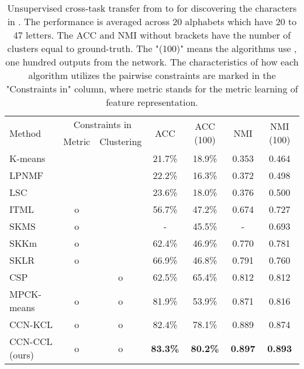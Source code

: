 \documentclass[10pt,twocolumn,letterpaper]{article}
\begin{document}
\begin{table*}[]
\centering
\caption{Unsupervised cross-task transfer from  to  for discovering the characters in . The performance is averaged across 20 alphabets which have 20 to 47 letters. The ACC and NMI without brackets have the number of clusters equal to ground-truth.  The "(100)" means the algorithms use , \ie one hundred outputs from the network. The characteristics of how each algorithm utilizes the pairwise constraints are marked in the "Constraints in" column, where metric stands for the metric learning of feature representation. }
\label{tab:crosstask-omnilgot}
\begin{tabular}{lcccccc}
\toprule
\multirow{2}{*}{Method} & \multicolumn{2}{c}{Constraints in} & \multirow{2}{*}{ACC} & \multirow{2}{*}{ACC (100)} & \multirow{2}{*}{NMI} & \multirow{2}{*}{NMI (100)} \\
                & Metric & Clustering &            &                              &                             &                              \\ \midrule
K-means \cite{macqueen1967some}        &     &      & 21.7\%    & 18.9\%  & 0.353   & 0.464  \\ 
LPNMF \cite{cai2009LPNMF}          &     &      & 22.2\%    & 16.3\%  & 0.372   & 0.498  \\
LSC \cite{chen2011LSC}            &     &      & 23.6\%    & 18.0\%  & 0.376   & 0.500  \\
ITML \cite{davis2007ITML}           & o   &      & 56.7\%    & 47.2\%  & 0.674   & 0.727  \\
SKMS \cite{anand2014SKMS}           & o   &      & -         & 45.5\%  & -       & 0.693  \\
SKKm \cite{anand2014SKMS}            & o   &      & 62.4\%    & 46.9\%  & 0.770   & 0.781  \\
SKLR \cite{amid2016SKLR}           & o   &      & 66.9\%    & 46.8\%  & 0.791   & 0.760  \\
CSP \cite{wang2014CSP}             &     & o    & 62.5\%    & 65.4\%  & 0.812   & 0.812  \\
MPCK-means \cite{bilenko2004MPCKMeans}     & o   & o    & 81.9\%    & 53.9\%  & 0.871   & 0.816  \\ 
CCN-KCL \cite{Hsu18iclr}            & o   & o    & 82.4\%    & 78.1\%  & 0.889   & 0.874  \\ \midrule
CCN-CCL (ours)     & o   & o    & \textbf{83.3\%}    & \textbf{80.2\%}  & \textbf{0.897}   & \textbf{0.893}  \\
\bottomrule                     
\end{tabular}
\end{table*}
\end{document}
